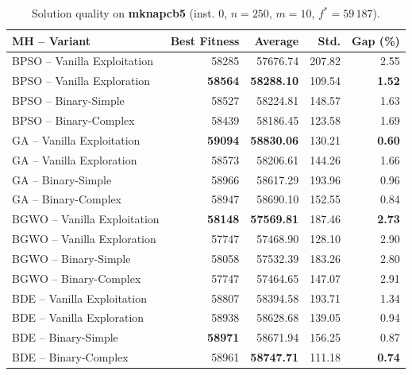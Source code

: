 \begin{table}[htbp]
  \centering
  \small
  \caption{Solution quality on \textbf{mknapcb5} (inst. 0, $n=250$, $m=10$, $f^*=59\,187$).}
  \label{tab:calidad_mknapcb5_0}
  \begin{tabular}{lrrrr}
    \toprule
    \textbf{MH -- Variant} &
    \textbf{Best Fitness} &
    \textbf{Average} &
    \textbf{Std.} &
    \textbf{Gap (\%)} \\
    \midrule
    BPSO -- Vanilla Exploitation &          58285 &         57676.74 & 207.82 &         2.55 \\
    BPSO -- Vanilla Exploration  & \textbf{58564} & \textbf{58288.10} & 109.54 & \textbf{1.52} \\
    BPSO -- Binary-Simple        &          58527 &         58224.81 & 148.57 &         1.63 \\
    BPSO -- Binary-Complex       &          58439 &         58186.45 & 123.58 &         1.69 \\
    \midrule
    GA -- Vanilla Exploitation   & \textbf{59094} & \textbf{58830.06} & 130.21 & \textbf{0.60} \\
    GA -- Vanilla Exploration    &          58573 &         58206.61 & 144.26 &         1.66 \\
    GA -- Binary-Simple          &          58966 &         58617.29 & 193.96 &         0.96 \\
    GA -- Binary-Complex         &          58947 &         58690.10 & 152.55 &         0.84 \\
    \midrule
    BGWO -- Vanilla Exploitation & \textbf{58148} & \textbf{57569.81} & 187.46 & \textbf{2.73} \\
    BGWO -- Vanilla Exploration  &          57747 &         57468.90 & 128.10 &         2.90 \\
    BGWO -- Binary-Simple        &          58058 &         57532.39 & 183.26 &         2.80 \\
    BGWO -- Binary-Complex       &          57747 &         57464.65 & 147.07 &         2.91 \\
    \midrule
    BDE -- Vanilla Exploitation  &          58807 &         58394.58 & 193.71 &         1.34 \\
    BDE -- Vanilla Exploration   &          58938 &         58628.68 & 139.05 &         0.94 \\
    BDE -- Binary-Simple         & \textbf{58971} &         58671.94 & 156.25 &         0.87 \\
    BDE -- Binary-Complex        &          58961 & \textbf{58747.71} & 111.18 & \textbf{0.74} \\
    \bottomrule
  \end{tabular}
\end{table}
